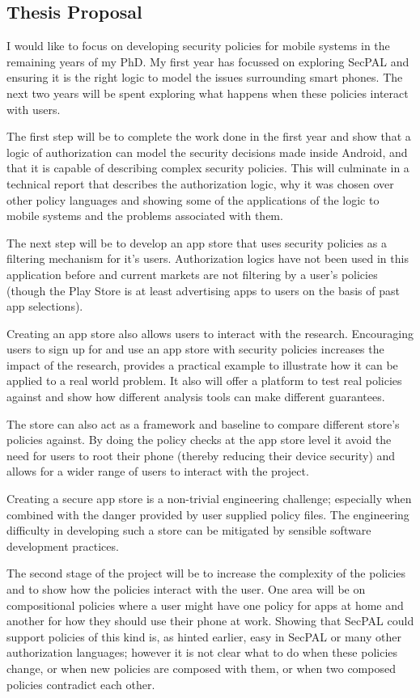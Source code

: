 \documentclass[a4paper,sfsidenotes]{tufte-book}
\begin{document}
\subsection{Thesis Proposal}

I would like to focus on developing security policies for mobile systems in the
remaining years of my PhD.  My first year has focussed on exploring SecPAL
and ensuring it is the right logic to model the issues surrounding smart phones.
The next two years will be spent exploring what happens when these policies
interact with users.

The first step will be to complete the work done in the first year and show that
a logic of authorization can model the security decisions made inside Android,
and that it is capable of describing complex security policies.  This will
culminate in a technical report that describes the authorization logic, why it
was chosen over other policy languages and showing some of the applications of
the logic to mobile systems and the problems associated with them.

The next step will be to develop an app store that uses security policies as a
filtering mechanism for it's users.  Authorization logics have not been used in
this application before and current markets are not filtering by a user's
policies (though the Play Store is at least advertising apps to users on the
basis of past app selections).

Creating an app store also allows users to interact with the research.
Encouraging users to sign up for and use an app store with security policies
increases the impact of the research, provides a practical example to illustrate
how it can be applied to a real world problem.  It also will offer a platform to
test real policies against and show how different analysis tools can make
different guarantees.  

The store can also act as a framework and baseline to compare different store's
policies against.  By doing the policy checks at the app store level it avoid
the need for users to root their phone (thereby reducing their device security)
and allows for a wider range of users to interact with the project. 

Creating a secure app store is a non-trivial engineering challenge; especially
when combined with the danger provided by user supplied policy files. The
engineering difficulty in developing such a store can be mitigated by sensible
software development practices. 

The second stage of the project will be to increase the complexity of the
policies and to show how the policies interact with the user.  One area will be
on compositional policies where a user might have one policy for apps at home
and another for how they should use their phone at work.  Showing that SecPAL
could support policies of this kind is, as hinted earlier, easy in SecPAL or
many other authorization languages; however it is
not clear what to do when these policies change, or when new policies are
composed with them, or when two composed policies contradict each other.
\end{document}
